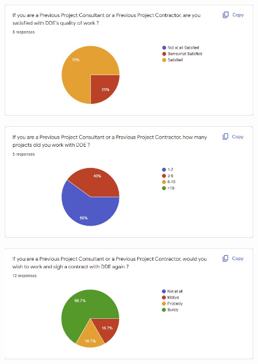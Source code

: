 	\begin{figure}[H]
    	\centering
    	\includegraphics[width=15cm]{q6.jpg}
    	\label{}
	\end{figure}
	
	\begin{figure}[H]
    	\centering
    	\includegraphics[width=15cm]{q7.jpg}
    	\label{}
	\end{figure}
	
	\begin{figure}[H]
    	\centering
    	\includegraphics[width=15cm]{q8.jpg}
    	\label{}
	\end{figure}
	
